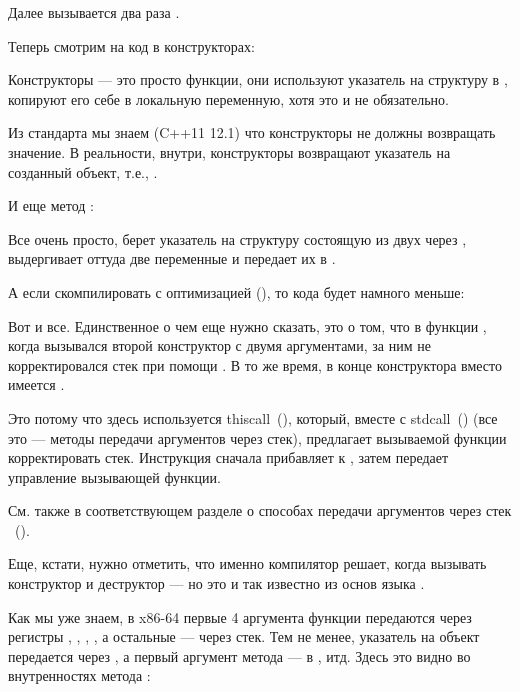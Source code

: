 Далее вызывается два раза .

Теперь смотрим на код в конструкторах:



Конструкторы --- это просто функции, они используют указатель на структуру в \ECX, 
копируют его себе в локальную переменную, хотя это и не обязательно.

Из стандарта \Cpp мы знаем (C++11 12.1) 
что конструкторы не должны возвращать значение.
В реальности, внутри, конструкторы возвращают указатель на созданный объект, т.е., \ITthis.

И еще метод :



Все очень просто,  берет указатель на структуру состоящую из двух \Tint через \ECX, 
выдергивает оттуда две переменные и передает их в \printf.

А если скомпилировать с оптимизацией (\Ox), то кода будет намного меньше:



Вот и все. Единственное о чем еще нужно сказать, это о том, что в функции \main, 
когда вызывался второй конструктор с двумя аргументами, за ним не корректировался стек при помощи 
. В то же время, в конце конструктора вместо \RET имеется .

Это потому что здесь используется thiscall~(), который, вместе с stdcall~()
(все это --- методы передачи аргументов через стек), предлагает вызываемой функции корректировать стек. 
Инструкция  сначала прибавляет  к \ESP, затем передает управление вызывающей функции.

См. также в соответствующем разделе о способах передачи аргументов через стек
~().

Еще, кстати, нужно отметить, что именно компилятор решает, когда вызывать конструктор и деструктор --- но это
и так известно из основ языка \Cpp.

\label{simple_CPP_MSVC_x64}

Как мы уже знаем, в x86-64 первые 4 аргумента функции передаются через регистры \RCX, \RDX, , 
, а остальные --- через стек.
Тем не менее, указатель на объект \ITthis передается через \RCX, а первый аргумент метода --- в \RDX, итд.
Здесь это видно во внутренностях метода 
:

